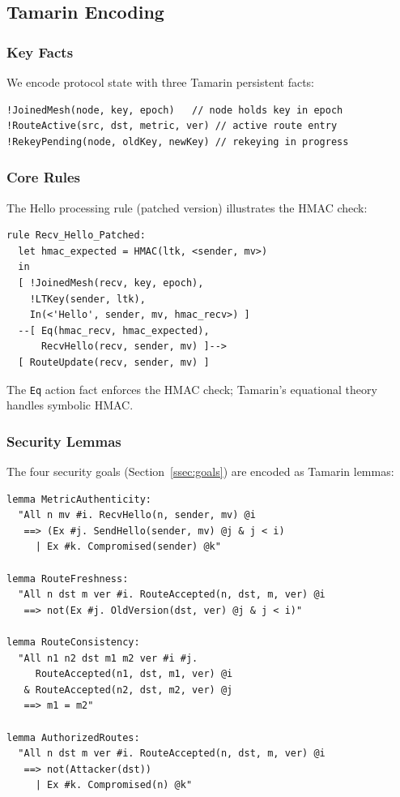 \documentclass[journal]{IEEEtran}
\begin{document}
\subsection{Tamarin Encoding}

\subsubsection{Key Facts}

We encode protocol state with three Tamarin persistent facts:
\begin{lstlisting}
!JoinedMesh(node, key, epoch)   // node holds key in epoch
!RouteActive(src, dst, metric, ver) // active route entry
!RekeyPending(node, oldKey, newKey) // rekeying in progress
\end{lstlisting}

\subsubsection{Core Rules}

The Hello processing rule (patched version) illustrates the HMAC check:
\begin{lstlisting}
rule Recv_Hello_Patched:
  let hmac_expected = HMAC(ltk, <sender, mv>)
  in
  [ !JoinedMesh(recv, key, epoch),
    !LTKey(sender, ltk),
    In(<'Hello', sender, mv, hmac_recv>) ]
  --[ Eq(hmac_recv, hmac_expected),
      RecvHello(recv, sender, mv) ]-->
  [ RouteUpdate(recv, sender, mv) ]
\end{lstlisting}

The \texttt{Eq} action fact enforces the HMAC check; Tamarin's
equational theory handles symbolic HMAC.

\subsubsection{Security Lemmas}

The four security goals (Section~\ref{ssec:goals}) are encoded as
Tamarin lemmas:

\begin{lstlisting}
lemma MetricAuthenticity:
  "All n mv #i. RecvHello(n, sender, mv) @i
   ==> (Ex #j. SendHello(sender, mv) @j & j < i)
     | Ex #k. Compromised(sender) @k"

lemma RouteFreshness:
  "All n dst m ver #i. RouteAccepted(n, dst, m, ver) @i
   ==> not(Ex #j. OldVersion(dst, ver) @j & j < i)"

lemma RouteConsistency:
  "All n1 n2 dst m1 m2 ver #i #j.
     RouteAccepted(n1, dst, m1, ver) @i
   & RouteAccepted(n2, dst, m2, ver) @j
   ==> m1 = m2"

lemma AuthorizedRoutes:
  "All n dst m ver #i. RouteAccepted(n, dst, m, ver) @i
   ==> not(Attacker(dst))
     | Ex #k. Compromised(n) @k"
\end{lstlisting}
\end{document}
